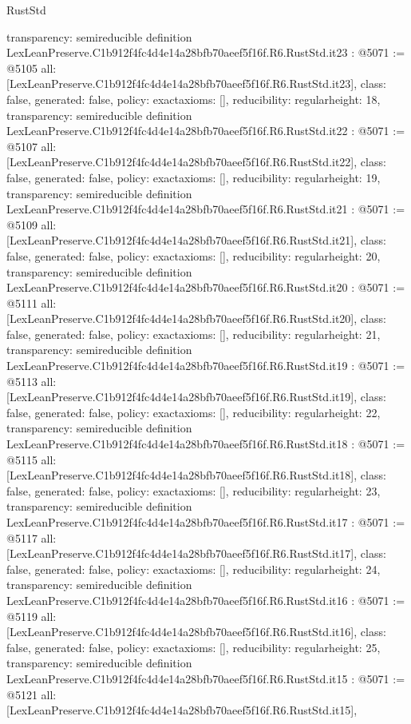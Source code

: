 \begin{lexlean}{RustStd}
\begin{coremodule}
{  transparency: semireducible
}
definition LexLeanPreserve.C1b912f4fc4d4e14a28bfb70aeef5f16f.R6.RustStd.it23 : @5071 := @5105 {
  all: [LexLeanPreserve.C1b912f4fc4d4e14a28bfb70aeef5f16f.R6.RustStd.it23],
  class: false,
  generated: false,
  policy: exact{axioms: []},
  reducibility: regular{height: 18},
  transparency: semireducible
}
definition LexLeanPreserve.C1b912f4fc4d4e14a28bfb70aeef5f16f.R6.RustStd.it22 : @5071 := @5107 {
  all: [LexLeanPreserve.C1b912f4fc4d4e14a28bfb70aeef5f16f.R6.RustStd.it22],
  class: false,
  generated: false,
  policy: exact{axioms: []},
  reducibility: regular{height: 19},
  transparency: semireducible
}
definition LexLeanPreserve.C1b912f4fc4d4e14a28bfb70aeef5f16f.R6.RustStd.it21 : @5071 := @5109 {
  all: [LexLeanPreserve.C1b912f4fc4d4e14a28bfb70aeef5f16f.R6.RustStd.it21],
  class: false,
  generated: false,
  policy: exact{axioms: []},
  reducibility: regular{height: 20},
  transparency: semireducible
}
definition LexLeanPreserve.C1b912f4fc4d4e14a28bfb70aeef5f16f.R6.RustStd.it20 : @5071 := @5111 {
  all: [LexLeanPreserve.C1b912f4fc4d4e14a28bfb70aeef5f16f.R6.RustStd.it20],
  class: false,
  generated: false,
  policy: exact{axioms: []},
  reducibility: regular{height: 21},
  transparency: semireducible
}
definition LexLeanPreserve.C1b912f4fc4d4e14a28bfb70aeef5f16f.R6.RustStd.it19 : @5071 := @5113 {
  all: [LexLeanPreserve.C1b912f4fc4d4e14a28bfb70aeef5f16f.R6.RustStd.it19],
  class: false,
  generated: false,
  policy: exact{axioms: []},
  reducibility: regular{height: 22},
  transparency: semireducible
}
definition LexLeanPreserve.C1b912f4fc4d4e14a28bfb70aeef5f16f.R6.RustStd.it18 : @5071 := @5115 {
  all: [LexLeanPreserve.C1b912f4fc4d4e14a28bfb70aeef5f16f.R6.RustStd.it18],
  class: false,
  generated: false,
  policy: exact{axioms: []},
  reducibility: regular{height: 23},
  transparency: semireducible
}
definition LexLeanPreserve.C1b912f4fc4d4e14a28bfb70aeef5f16f.R6.RustStd.it17 : @5071 := @5117 {
  all: [LexLeanPreserve.C1b912f4fc4d4e14a28bfb70aeef5f16f.R6.RustStd.it17],
  class: false,
  generated: false,
  policy: exact{axioms: []},
  reducibility: regular{height: 24},
  transparency: semireducible
}
definition LexLeanPreserve.C1b912f4fc4d4e14a28bfb70aeef5f16f.R6.RustStd.it16 : @5071 := @5119 {
  all: [LexLeanPreserve.C1b912f4fc4d4e14a28bfb70aeef5f16f.R6.RustStd.it16],
  class: false,
  generated: false,
  policy: exact{axioms: []},
  reducibility: regular{height: 25},
  transparency: semireducible
}
definition LexLeanPreserve.C1b912f4fc4d4e14a28bfb70aeef5f16f.R6.RustStd.it15 : @5071 := @5121 {
  all: [LexLeanPreserve.C1b912f4fc4d4e14a28bfb70aeef5f16f.R6.RustStd.it15],
}
\end{coremodule}
\end{lexlean}
